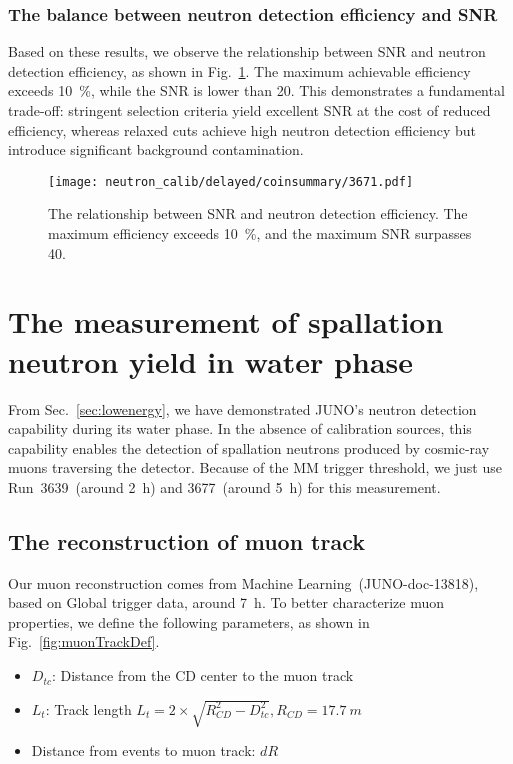 \subsection{The balance between neutron detection efficiency and SNR}
Based on these results, we observe the relationship between SNR and neutron detection efficiency, as shown in Fig.~\ref{fig:snr-efficiency}. The maximum achievable efficiency exceeds \SI{10}{\%}, while the SNR is lower than 20. This demonstrates a fundamental trade-off: stringent selection criteria yield excellent SNR at the cost of reduced efficiency, whereas relaxed cuts achieve high neutron detection efficiency but introduce significant background contamination.
\begin{figure}[h]
	\centering
	\texttt{[image: neutron\_calib/delayed/coinsummary/3671.pdf]}
	\caption{The relationship between SNR and neutron detection efficiency. The maximum efficiency exceeds \SI{10}{\%}, and the maximum SNR surpasses 40.}
	\label{fig:snr-efficiency}
\end{figure}

\chapter{The measurement of spallation neutron yield in water phase}
From Sec.~\ref{sec:lowenergy}, we have demonstrated JUNO's neutron detection capability during its water phase. In the absence of calibration sources, this capability enables the detection of spallation neutrons produced by cosmic-ray muons traversing the detector. Because of the MM trigger threshold, we just use Run~3639~(around \SI{2}{h}) and 3677~(around \SI{5}{h}) for this measurement.
\section{The reconstruction of muon track}
Our muon reconstruction comes from Machine Learning~(JUNO-doc-13818), based on Global trigger data, around \SI{7}{h}.
To better characterize muon properties, we define the following parameters, as shown in Fig.~\ref{fig:muonTrackDef}.
\begin{itemize}
	\item $D_{tc}$: Distance from the CD center to the muon track
	\item $L_t$: Track length $L_t=2\times\sqrt{R^2_{CD}-D^2_{tc}}, R_{CD}=\SI{17.7}{m}$
	\item Distance from events to muon track: $dR$
\end{itemize}

